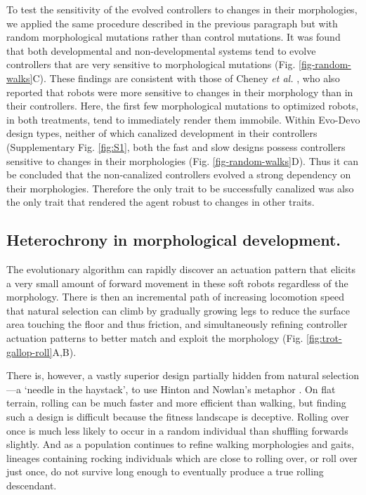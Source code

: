 To test the sensitivity of the evolved controllers to changes in their morphologies, we applied the same procedure described in the previous paragraph but with random morphological mutations rather than control mutations.
It was found that both developmental and non-developmental systems tend to evolve controllers that are very sensitive to morphological mutations (Fig. \ref{fig-random-walks}C).
These findings are consistent with those of Cheney \textit{et al.} \cite{cheney2018scalable}, who also reported that robots were more sensitive to changes in their morphology than in their controllers.
Here, the first few morphological mutations to optimized robots, in both treatments, tend to immediately render them immobile.
Within Evo-Devo design types, neither of which canalized development in their controllers (Supplementary Fig. \ref{fig:S1},%
both the fast and slow designs possess controllers sensitive to changes in their morphologies (Fig. \ref{fig-random-walks}D).
Thus it can be concluded that the non-canalized controllers evolved a strong dependency on their morphologies. 
Therefore the only trait to be successfully canalized was also the only trait that rendered the agent robust to changes in other traits.



\subsection*{Heterochrony in morphological development.}


The evolutionary algorithm can rapidly discover an actuation pattern that elicits a very small amount of forward movement in these soft robots regardless of the morphology. 
There is then an incremental path of increasing locomotion speed that natural selection can climb by gradually growing legs to reduce the surface area touching the floor and thus friction, and simultaneously refining controller actuation patterns to better match and exploit the morphology (Fig. \ref{fig:trot-gallop-roll}A,B).


There is, however, a vastly superior design partially hidden from natural selection---a `needle in the haystack', to use Hinton and Nowlan's metaphor \cite{hinton1987learning}.
On flat terrain, rolling can be much faster and more efficient than walking, but finding such a design is difficult because the fitness landscape is deceptive.
Rolling over once is much less likely to occur in a random individual than shuffling forwards slightly. And as a population continues to refine walking morphologies and gaits, lineages containing rocking individuals which are close to rolling over, or roll over just once, do not survive long enough to eventually produce a true rolling descendant. 

